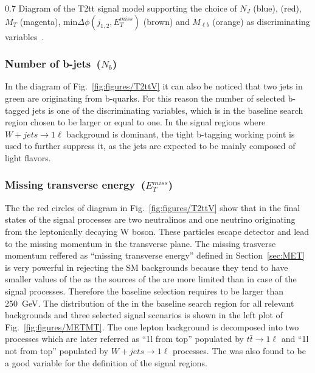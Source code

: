                  {0.7}       %
                 { Diagram of the T2tt signal model supporting the choice of $N_{J}$ (blue), \MET (red),  $M_{T}$ (magenta), min$\Delta \phi (j_{1,2}, E_{T}^{miss})$ (brown) and $M_{\ell b}$ (orange) as discriminating variables~\cite{CMS:2016vew}. }

\subsubsection{Number of b-jets~($N_{b}$)}

In the diagram of Fig.~\ref{fig:figures/T2ttV} it can also be noticed that two jets in green are originating from b-quarks. For this reason the number of selected b-tagged jets is one of the discriminating variables, which is in the baseline search region  chosen to be larger or equal to one. In the signal regions where $W+jets \to 1\ell$  background is dominant, the tight b-tagging working point is used to further suppress it, as the jets are expected to be mainly composed of light flavors.

\subsubsection{Missing transverse energy~($E_{T}^{miss}$)}

The the red circles of diagram in Fig.~\ref{fig:figures/T2ttV} show that in the final states of the signal processes are two neutralinos and one neutrino originating from the leptonically decaying W boson. These particles escape detector and lead to the missing momentum in the transverse plane. The missing trasverse momentum reffered as ``missing transverse energy'' defined in Section~\ref{sec:MET} is very powerful in rejecting the SM backgrounds because they tend to have smaller values of the \MET as the sources of the \MET are more limited than in case of the signal processes. Therefore the baseline selection requires \MET to be larger than 250~GeV. The distribution of the \MET in the baseline search region for all relevant backgrounds and three selected signal scenarios is shown in the left plot of Fig.~\ref{fig:figures/METMT}. The one lepton background is decomposed into two processes which are later referred as ``1l from top'' populated by $t \bar{t} \to 1\ell$ and ``1l not from top'' populated by $W+jets \to 1\ell$  processes. The \MET was also found to be a good variable for the definition of the signal regions.

